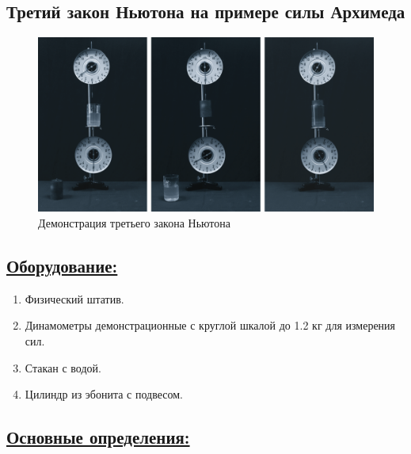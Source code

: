\documentclass[14pt,a4paper,oneside]{extarticle}	%
\begin{document}

\newpage
\begin{center}
	\subsection*{Третий закон Ньютона на примере силы Архимеда}
\end{center}

\begin{figure}[H]
	\centering 		
	\includegraphics[width=1\linewidth]{newton-3.png} 
	\caption{Демонстрация третьего закона Ньютона}
	\label{newton-3}
\end{figure}

\subsection*{\underline{Оборудование:}}

\begin{enumerate}
	\item Физический штатив.
	\item Динамометры демонстрационные с круглой шкалой до 1.2 кг для измерения сил.
	\item Стакан с водой.
	\item Цилиндр из эбонита с подвесом.
\end{enumerate}

\subsection*{\underline{Основные определения:}}
\end{document}
